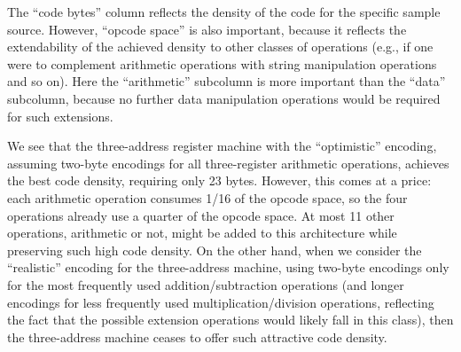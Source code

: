 \documentclass[12pt,oneside]{article}
\def\refpoint#1{{\rm\textbf{\ref{#1}}}}
\let\ptref=\refpoint
\begin{document}
\begin{table}
\caption{A summary of machine code properties for hypothetical 3-address, 2-address, 1-address, and stack machines, generated for a sample leaf function (cf.~\ptref{sp:cmp1.source}). The two most important columns, reflecting {\bf code density} and {\bf extendability} to other operations, are marked by bold font. Smaller values are better in both of these columns.}\label{tab:cmp1.code}
\end{table}
  
The ``code bytes'' column reflects the density of the code for the specific sample source. However, ``opcode space'' is also important, because it reflects the extendability of the achieved density to other classes of operations (e.g., if one were to complement arithmetic operations with string manipulation operations and so on). Here the ``arithmetic'' subcolumn is more important than the ``data'' subcolumn, because no further data manipulation operations would be required for such extensions.

We see that the three-address register machine with the ``optimistic'' encoding, assuming two-byte encodings for all three-register arithmetic operations, achieves the best code density, requiring only 23 bytes. However, this comes at a price: each arithmetic operation consumes 1/16 of the opcode space, so the four operations already use a quarter of the opcode space. At most 11 other operations, arithmetic or not, might be added to this architecture while preserving such high code density. On the other hand, when we consider the ``realistic'' encoding for the three-address machine, using two-byte encodings only for the most frequently used addition/subtraction operations (and longer encodings for less frequently used multiplication/division operations, reflecting the fact that the possible extension operations would likely fall in this class), then the three-address machine ceases to offer such attractive code density.
\end{document}
